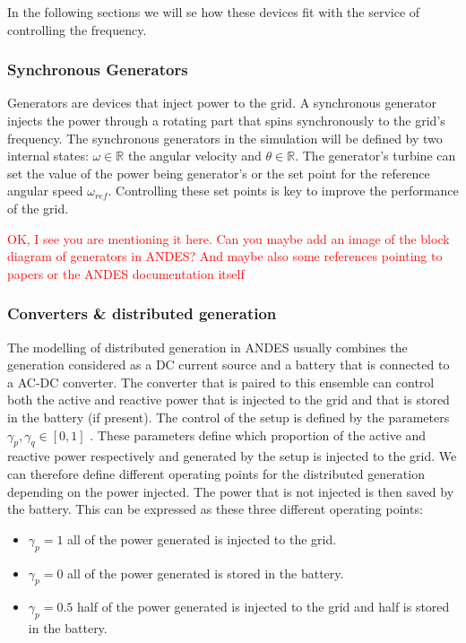 \documentclass{article}
\begin{document}
In the following sections we will se how these devices fit with the service of controlling the frequency.

\subsubsection*{Synchronous Generators}

Generators are devices that inject power to the grid. A synchronous generator injects the power through a rotating part that spins synchronously to the grid's frequency. The synchronous generators in the simulation will be defined by two internal states: $\omega \in \mathbb{R}$ the angular velocity and $\theta  \in \mathbb{R}$. The generator's turbine can set the value of the power being generator's or the set point for the reference angular speed $\omega_{ref}$. Controlling these set points is key to improve the performance of the grid.

\textcolor{red}{OK, I see you are mentioning it here. Can you maybe add an image of the block diagram of generators in ANDES? And maybe also some references pointing to papers or the ANDES documentation itself}

\subsubsection*{Converters \& distributed generation}

The modelling of distributed generation in ANDES usually combines the generation considered as a DC current source and a battery that is connected to a AC-DC converter. The converter that is paired to this ensemble can control both the active and reactive power that is injected to the grid and that is stored in the battery (if present). The control of the setup is defined by the parameters $\gamma_p, \gamma_q \in [0,1]$ . These parameters define which proportion of the active and reactive power respectively and generated by the setup is injected to the grid. We can therefore define different operating points for the distributed generation depending on the power injected. The power that is not injected is then saved by the battery. This can be expressed as these three different operating points:

\begin{itemize}
    \item $\gamma_p = 1$ all of the power generated is injected to the grid.
    \item $\gamma_p = 0$ all of the power generated is stored in the battery.
    \item $\gamma_p = 0.5$ half of the power generated is injected to the grid and half is stored in the battery.
\end{itemize}
\end{document}
